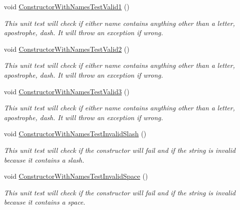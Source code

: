 \begin{DoxyCompactItemize}
\item 
void \hyperlink{class_my_all_employee_1_1_tests_1_1_seasonal_employee_tests_a710b6ac7570bad98db92aa4b614d1cd7}{Constructor\+With\+Names\+Test\+Valid1} ()
\begin{DoxyCompactList}\small\item\em This unit test will check if either name contains anything other than a letter, apostrophe, dash. It will throw an exception if wrong. \end{DoxyCompactList}\item 
void \hyperlink{class_my_all_employee_1_1_tests_1_1_seasonal_employee_tests_afbef5fa6965f0050225b570b04fcfb6e}{Constructor\+With\+Names\+Test\+Valid2} ()
\begin{DoxyCompactList}\small\item\em This unit test will check if either name contains anything other than a letter, apostrophe, dash. It will throw an exception if wrong. \end{DoxyCompactList}\item 
void \hyperlink{class_my_all_employee_1_1_tests_1_1_seasonal_employee_tests_a276d4c45b475da23e370b2f7b49d8e2e}{Constructor\+With\+Names\+Test\+Valid3} ()
\begin{DoxyCompactList}\small\item\em This unit test will check if either name contains anything other than a letter, apostrophe, dash. It will throw an exception if wrong. \end{DoxyCompactList}\item 
void \hyperlink{class_my_all_employee_1_1_tests_1_1_seasonal_employee_tests_a2a3e05cecdf76db17637ec9400429d0c}{Constructor\+With\+Names\+Test\+Invalid\+Slash} ()
\begin{DoxyCompactList}\small\item\em This unit test will check if the constructor will fail and if the string is invalid because it contains a slash. \end{DoxyCompactList}\item 
void \hyperlink{class_my_all_employee_1_1_tests_1_1_seasonal_employee_tests_a02019081a27a0983cb5f7d29c4a72d08}{Constructor\+With\+Names\+Test\+Invalid\+Space} ()
\begin{DoxyCompactList}\small\item\em This unit test will check if the constructor will fail and if the string is invalid because it contains a space. \end{DoxyCompactList}\item 

\end{DoxyCompactItemize}
